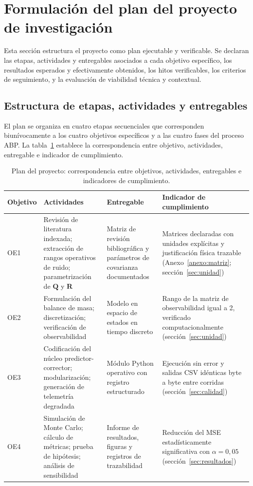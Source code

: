 \section{Formulación del plan del proyecto de investigación}
\label{sec:plan}

Esta sección estructura el proyecto como plan ejecutable y verificable. Se
declaran las etapas, actividades y entregables asociados a cada objetivo
específico, los resultados esperados y efectivamente obtenidos, los hitos
verificables, los criterios de seguimiento, y la evaluación de viabilidad
técnica y contextual.

\subsection{Estructura de etapas, actividades y entregables}

El plan se organiza en cuatro etapas secuenciales que corresponden
biunívocamente a los cuatro objetivos específicos y a las cuatro fases del
proceso ABP. La tabla~\ref{tab:plan} establece la correspondencia entre
objetivo, actividades, entregable e indicador de cumplimiento.

\begin{table}[H]
\centering
\caption{Plan del proyecto: correspondencia entre objetivos, actividades,
entregables e indicadores de cumplimiento.}
\label{tab:plan}
\footnotesize
\begin{tabular}{@{}p{1.5cm}p{3.5cm}p{3.6cm}p{4.6cm}@{}}
\toprule
\textbf{Objetivo} & \textbf{Actividades} & \textbf{Entregable} &
\textbf{Indicador de cumplimiento}\\
\midrule
OE1 &
Revisión de literatura indexada; extracción de rangos operativos de ruido;
parametrización de $\mathbf{Q}$ y $\mathbf{R}$ &
Matriz de revisión bibliográfica y parámetros de covarianza documentados &
Matrices declaradas con unidades explícitas y justificación física trazable
(Anexo~\ref{anexo:matriz}; sección~\ref{sec:unidad})\\
\addlinespace
OE2 &
Formulación del balance de masa; discretización; verificación de
observabilidad &
Modelo en espacio de estados en tiempo discreto &
Rango de la matriz de observabilidad igual a 2, verificado
computacionalmente (sección~\ref{sec:unidad})\\
\addlinespace
OE3 &
Codificación del núcleo predictor-corrector; modularización; generación de
telemetría degradada &
Módulo Python operativo con registro estructurado &
Ejecución sin error y salidas CSV idénticas byte a byte entre corridas
(sección~\ref{sec:calidad})\\
\addlinespace
OE4 &
Simulación de Monte Carlo; cálculo de métricas; prueba de hipótesis; análisis
de sensibilidad &
Informe de resultados, figuras y registros de trazabilidad &
Reducción del MSE estadísticamente significativa con $\alpha = 0{,}05$
(sección~\ref{sec:resultados})\\
\bottomrule
\end{tabular}
\end{table}

